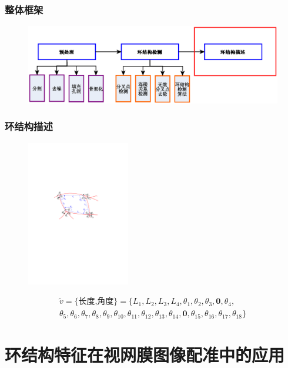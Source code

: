 \documentclass[notheorems,mathserif,table,compress]{beamer}  %
\begin{document}
\begin{frame}
\frametitle{整体框架}
\begin{figure}
\centering
    \centering
    \includegraphics[width=12cm]{chap02/cycle-framework3}\medskip
\end{figure}
\end{frame}

\begin{frame}
\frametitle{环结构描述}
\begin{figure}[H]
\centering
\includegraphics[width=0.4\textwidth]{chap02/description.pdf}
\caption*{\color{blue}{环结构描述}}
\end{figure}
\begin{multline}
\tilde{v}=\{\textrm{长度,角度}\}=\{L_{1},L_{2},L_{3},L_{4},\theta_{1},\theta_{2},\theta_{3},\mathbf{0},\theta_{4},\\\theta_{5},\theta_{6},\theta_{7},\theta_{8},\theta_{9},\theta_{10},\theta_{11},\theta_{12},\theta_{13},\theta_{14},\mathbf{0},\theta_{15},\theta_{16},\theta_{17},\theta_{18}\}
\end{multline}
\begin{center}
\color{red} 
\end{center}
\end{frame}
\section{环结构特征在视网膜图像配准中的应用}
\end{document}
